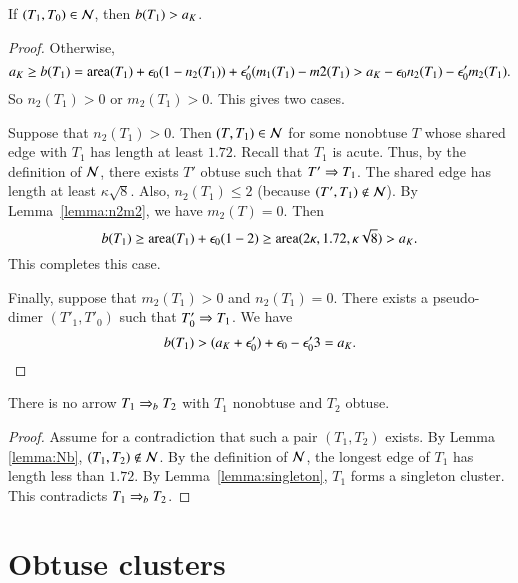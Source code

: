 \begin{lemma}\label{lemma:Nb}  If $(T_1,T_0)\in \mathcal N$, then $b(T_1)>a_K$.
\end{lemma}

\begin{proof}  Otherwise,
\[
a_K \ge b(T_1) = {\operatorname{area}}(T_1) + \epsilon_0 (1 - n_2(T_1)) + \epsilon_0' (m_1(T_1)-m2(T_1) > a_K - \epsilon_0 n_2(T_1) - \epsilon_0' m_2(T_1).
\]
So $n_2(T_1) > 0$ or $m_2(T_1)>0$. This gives two cases.  

Suppose that $n_2(T_1) >0$.  Then $(T,T_1)\in\mathcal N$ for some nonobtuse $T$ whose shared edge with $T_1$ has length at least $1.72$.
Recall that $T_1$ is acute.  Thus, by the definition of $\mathcal N$, there exists $T'$ obtuse such that $T'\Rightarrow T_1$.  The shared edge
has length at least $\kappa\sqrt8$.  Also, $n_2(T_1)\le 2$ (because $(T',T_1)\not\in \mathcal N$).  By Lemma~\ref{lemma:n2m2}, we have
$m_2(T)=0$.  Then
\[
b(T_1) \ge {\operatorname{area}}(T_1) + \epsilon_0 (1 - 2) \ge {\operatorname{area}} (2\kappa,1.72,\kappa\sqrt8) > a_K.
\]
This completes this case.

Finally, suppose that $m_2(T_1)>0$ and $n_2(T_1)=0$.  There exists a pseudo-dimer $(T'_1,T'_0)$ such that $T'_0\Rightarrow T_1$.
We have
\[
b(T_1) > (a_K + \epsilon_0') + \epsilon_0 -\epsilon_0'  3 = a_K.
\]
\end{proof}



\begin{lemma} 
  There is no arrow $T_1 \Rightarrow_{b} T_2$ with $T_1$ nonobtuse and $T_2$
  obtuse.
\end{lemma}

\begin{proof}  
  Assume for a contradiction that such a pair $(T_1,T_2)$ exists.
By Lemma \ref{lemma:Nb}, $(T_1,T_2)\not\in\mathcal N$.
By the definition of $\mathcal N$, the longest edge of $T_1$ has length
less than $1.72$.  By Lemma~\ref{lemma:singleton}, $T_1$ forms
a singleton cluster.  This contradicts $T_1\Rightarrow_{b} T_2$.
\end{proof}


\section{Obtuse clusters}


